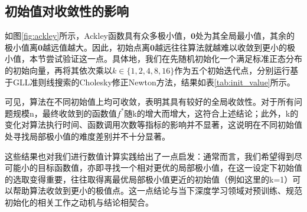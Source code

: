 \documentclass{article}
\begin{document}
\subsection{初始值对收敛性的影响}
如图\ref{fig:ackley}所示，Ackley函数具有众多极小值，$\mathbf{0}$处为其全局最小值，其余的极小值离$\mathbf{0}$越远值越大。因此，初始点离$\mathbf{0}$越远往往算法就越难以收敛到更小的极小值，本节尝试验证这一点。具体地，我们在先随机初始化一个满足标准正态分布的初始向量，再将其依次乘以$k\in \{1,2,4,8,16\}$作为五个初始迭代点，分别运行基于GLL准则线搜索的Cholesky修正Newton方法，结果如表\ref{tab:init_value}所示。

可见，算法在不同初始值上均可收敛，表明其具有较好的全局收敛性。对于所有问题规模n，最终收敛到的函数值$f^*$随k的增大而增大，这符合上述结论；此外，k的变化对算法执行时间、函数调用次数等指标的影响并不显著，这说明在不同初始值处寻找局部极小值的难度差别并不十分显著。

这些结果也对我们进行数值计算实践给出了一点启发：通常而言，我们希望得到尽可能小的目标函数值，亦即寻找一个相对更优的局部极小值，在这一设定下初始值的选取变得重要，往往取得离最优局部极小值更近的初始值（例如这里的k=1）可以帮助算法收敛到更小的极值点。这一点结论与当下深度学习领域对预训练、规范初始化的相关工作之动机与结论相契合。
\end{document}
